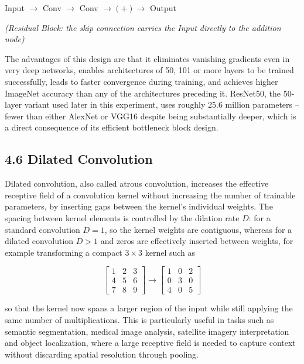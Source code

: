 \documentclass[11pt,a4paper]{article}
\begin{document}
\begin{center}
Input $\rightarrow$ Conv $\rightarrow$ Conv $\rightarrow (+) \rightarrow$ Output
\end{center}
\begin{center}
\textit{(Residual Block: the skip connection carries the Input directly to the addition node)}
\end{center}

\vspace{0.15cm}

The advantages of this design are that it eliminates vanishing gradients even in very deep networks, enables architectures of 50, 101 or more layers to be trained successfully, leads to faster convergence during training, and achieves higher ImageNet accuracy than any of the architectures preceding it. ResNet50, the 50-layer variant used later in this experiment, uses roughly 25.6 million parameters -- fewer than either AlexNet or VGG16 despite being substantially deeper, which is a direct consequence of its efficient bottleneck block design.

\subsection*{4.6 Dilated Convolution}

Dilated convolution, also called atrous convolution, increases the effective receptive field of a convolution kernel without increasing the number of trainable parameters, by inserting gaps between the kernel's individual weights. The spacing between kernel elements is controlled by the dilation rate $D$: for a standard convolution $D=1$, so the kernel weights are contiguous, whereas for a dilated convolution $D>1$ and zeros are effectively inserted between weights, for example transforming a compact $3\times3$ kernel such as

\[
\begin{bmatrix}
1 & 2 & 3\\
4 & 5 & 6\\
7 & 8 & 9
\end{bmatrix}
\rightarrow
\begin{bmatrix}
1 & 0 & 2\\
0 & 3 & 0\\
4 & 0 & 5
\end{bmatrix}
\]

so that the kernel now spans a larger region of the input while still applying the same number of multiplications. This is particularly useful in tasks such as semantic segmentation, medical image analysis, satellite imagery interpretation and object localization, where a large receptive field is needed to capture context without discarding spatial resolution through pooling.
\end{document}

